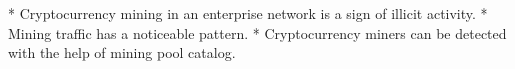 * Cryptocurrency mining in an enterprise network is a sign of illicit activity.
* Mining traffic has a noticeable pattern.
* Cryptocurrency miners can be detected with the help of mining pool catalog.
